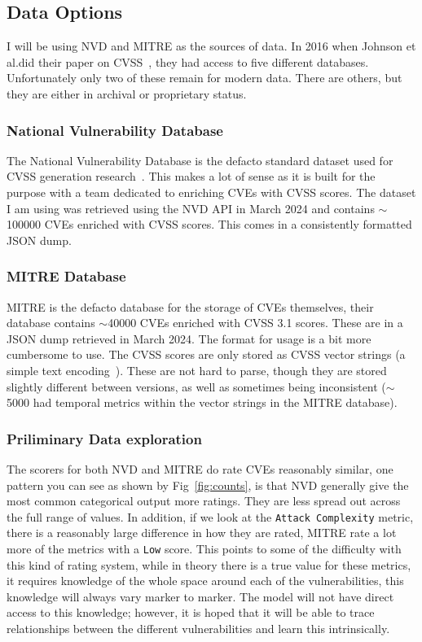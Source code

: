 \documentclass[12pt]{article}
\begin{document}
\subsection{Data Options}

I will be using NVD and MITRE as the sources of data. In 2016 when Johnson et al.\@ did their paper
on CVSS~\cite{bayes}, they had access to five different databases. Unfortunately only two of these
remain for modern data. There are others, but they are either in archival or proprietary status.

\subsubsection{National Vulnerability Database} \label{NVD_SECTION}

The National Vulnerability Database is the defacto standard dataset used for CVSS generation
research~\cite{costa, nvd_example1, nvd_example2}.  This makes a lot of sense as it is built
for the purpose with a team dedicated to enriching CVEs with CVSS scores. The dataset I am using was
retrieved using the NVD API in March 2024 and contains $\sim$100000 CVEs enriched with CVSS scores. This
comes in a consistently formatted JSON dump.

\subsubsection{MITRE Database}  \label{MITRE_SECTION}

MITRE is the defacto database for the storage of CVEs themselves, their database contains $\sim$40000
CVEs enriched with CVSS 3.1 scores. These are in a JSON dump retrieved in March 2024. The
format for usage is a bit more cumbersome to use. The CVSS scores are only stored as CVSS vector
strings (a simple text encoding~\cite{vector_string}). These are not hard to parse, though they are stored slightly
different between versions, as well as sometimes being inconsistent ($\sim$5000 had temporal metrics within
the vector strings in the MITRE database).

\subsubsection{Priliminary Data exploration}

The scorers for both NVD and MITRE do rate CVEs reasonably similar, one pattern you can see as shown
by Fig~\ref{fig:counts}, is that NVD generally give the most common categorical output more ratings.
They are less spread out across the full range of values. In addition, if we look at the
\texttt{Attack Complexity} metric, there is a reasonably large difference in how they are rated,
MITRE rate a lot more of the metrics with a \texttt{Low} score. This points to some of the
difficulty with this kind of rating system, while in theory there is a true value for these metrics,
it requires knowledge of the whole space around each of the vulnerabilities, this knowledge will
always vary marker to marker. The model will not have direct access to this knowledge; however, it
is hoped that it will be able to trace relationships between the different vulnerabilities and learn
this intrinsically.
\end{document}
